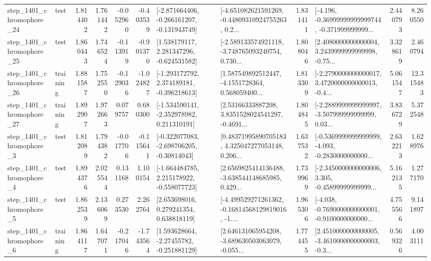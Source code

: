 \begin{tabular}{llrrrrllrlrr}
 step\_1401\_chromophore\_24 &      test &      1.814402 &    1.761442 &     -0.052960 & -0.403539 &  [-2.871664406, -0.266161207, -0.131943749] &  [-4.651082621591269, -0.44809310924755263, 0.2... &       1.831411 &  [-4.196, -0.36999999999999744, -0.371999999999... &            2.440793 &          8.260550 \\
 step\_1401\_chromophore\_25 &      test &      1.860443 &    1.746524 &     -0.113919 & -0.901370 &    [1.538179117, 2.281347296, -0.624531582] &  [-2.589133574921118, -3.748765093240754, 0.730... &       1.808046 &  [2.4080000000000004, 3.2439999999999998, -0.75... &            3.328619 &          2.460794 \\
 step\_1401\_chromophore\_26 &  training &      1.881587 &    1.752550 &     -0.129036 & -1.024827 &   [-1.293172792, 2.374189181, -0.396218613] &  [1.587549892512447, -4.1551728364, 0.568059400... &       1.813309 &  [-2.2790000000000017, 3.4720000000000013, -0.4... &            5.061547 &         12.315483 \\
 step\_1401\_chromophore\_27 &  training &      1.892907 &    1.972663 &      0.079757 &  0.680300 &   [-1.534590141, -2.352978982, 0.211310191] &  [2.53166333887208, 3.8351528024541297, -0.4691... &       1.804845 &  [-2.2889999999999997, -3.507999999999999, 0.03... &            3.836729 &          5.372548 \\
  step\_1401\_chromophore\_3 &      test &      1.812089 &    1.794382 &     -0.017706 & -0.115641 &   [-0.322077083, -2.698706205, -0.30814043] &  [0.48371995890705183, 4.325047277053148, 0.206... &       1.637532 &  [-0.5369999999999999, -4.093, -0.2830000000000... &            2.632213 &          1.628976 \\
  step\_1401\_chromophore\_4 &      test &      1.894376 &    2.025544 &      0.131168 &  1.100154 &   [-1.664484785, 2.215178922, -0.558077723] &  [2.6569825414136488, -3.638544148685985, 0.429... &       1.739969 &  [-2.3450000000000006, 3.305, -0.45899999999999... &            5.162135 &          1.277170 \\
  step\_1401\_chromophore\_5 &      test &      1.862539 &    2.136069 &      0.273530 &  2.262764 &     [2.653698016, 0.279241354, 0.638818119] &  [-4.499529271261362, -0.16814568129819016, -1.... &       1.965306 &  [-4.038, -0.7690000000000001, -0.9100000000000... &            4.755566 &          9.141897 \\
  step\_1401\_chromophore\_6 &  training &      1.864117 &    1.647071 &     -0.217046 & -1.743564 &    [1.593628664, -2.27455782, -0.251881129] &  [2.646131065954208, -3.689630503063079, -0.055... &       1.774455 &  [2.4510000000000005, -3.4610000000000003, -0.3... &            0.569326 &          4.003111 \\

\end{tabular}
